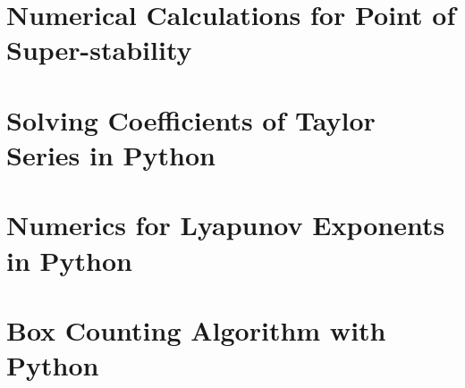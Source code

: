 \documentclass[12pt,oneside]{report}
\begin{document}
\begin{appendices}
	\chapter{Numerical Calculations for Point of Super-stability}
	
    \chapter{Solving Coefficients of Taylor Series in Python}
	
    \chapter{Numerics for Lyapunov Exponents in Python}
    
    \chapter{Box Counting Algorithm with Python}
    
\end{appendices}

%  
\printbibliography
{}
\end{document}
